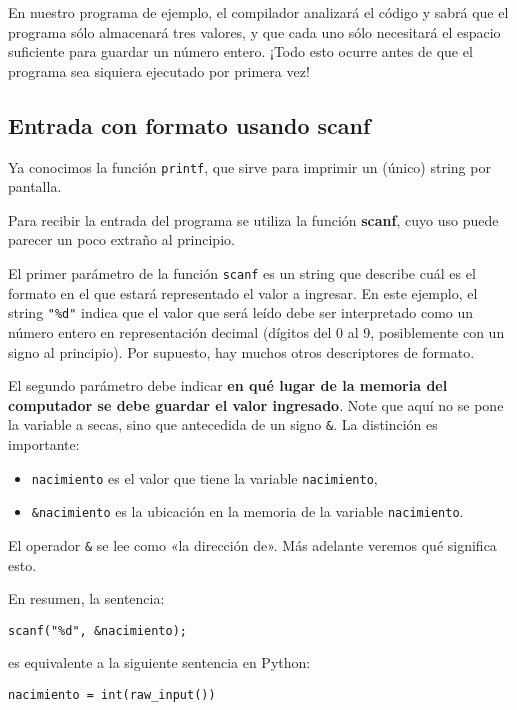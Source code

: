 En nuestro programa de ejemplo, el compilador analizará el código y
sabrá que el programa sólo almacenará tres valores, y que cada uno sólo
necesitará el espacio suficiente para guardar un número entero. ¡Todo
esto ocurre antes de que el programa sea siquiera ejecutado por primera
vez!

\subsection{Entrada con formato usando scanf}

Ya conocimos la función \lstinline!printf!, que sirve para imprimir un
(único) string por pantalla.

Para recibir la entrada del programa se utiliza la función
\textbf{scanf}, cuyo uso puede parecer un poco extraño al principio.

El primer parámetro de la función \lstinline!scanf! es un string que
describe cuál es el formato en el que estará representado el valor a
ingresar. En este ejemplo, el string \lstinline!"%d"! indica que el
valor que será leído debe ser interpretado como un número entero en
representación decimal (dígitos del 0 al 9, posiblemente con un signo al
principio). Por supuesto, hay muchos otros descriptores de formato.

El segundo parámetro debe indicar \textbf{en qué lugar de la memoria del
computador se debe guardar el valor ingresado}. Note que aquí no se pone
la variable a secas, sino que antecedida de un signo \lstinline!&!. La
distinción es importante:

\begin{itemize}
\item
  \lstinline!nacimiento! es el valor que tiene la variable
  \lstinline!nacimiento!,
\item
  \lstinline!&nacimiento! es la ubicación en la memoria de la variable
  \lstinline!nacimiento!.
\end{itemize}

El operador \lstinline!&! se lee como «la dirección de». Más adelante
veremos qué significa esto.

En resumen, la sentencia:

\begin{lstlisting}
scanf("%d", &nacimiento);
\end{lstlisting}

es equivalente a la siguiente sentencia en Python:

\begin{lstlisting}
nacimiento = int(raw_input())
\end{lstlisting}

